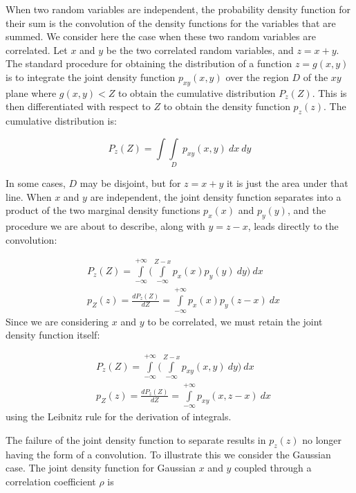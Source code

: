 \documentclass{article}
\begin{document}
When two random variables are independent, the probability density function for their sum is the
convolution of the density functions for the variables that are summed. We consider here the case
when these two random variables are correlated. Let $x$ and $y$ be the two correlated random variables,
and $z = x + y$. The standard procedure for obtaining the distribution of a function $z = g(x,y)$ is to
integrate the joint density function $p_{xy}(x,y)$ over the region $D$ of the $xy$ plane where $g(x,y) < Z$ to
obtain the cumulative distribution $P_z(Z)$. This is then differentiated with respect to $Z$ to obtain the
density function $p_z(z)$. The cumulative distribution is:

\begin{equation}
    P_z(Z)= \int\int\limits_D \> p_{xy}(x,y) \>dx \>dy
\end{equation}

In some cases, $D$ may be disjoint, but for $z = x + y$ it is just the area under that line. When $x$ and $y$ are
independent, the joint density function separates into a product of the two marginal density functions
$p_x(x)$ and $p_y(y)$, and the procedure we are about to describe, along with $y = z - x$, leads directly to the
convolution:

\begin{equation}
    \begin{split}
        & P_z(Z) = \int\limits_{-\infty}^{+\infty} \Biggl( \int\limits_{-\infty}^{Z-x} p_x(x)p_y(y) \> dy \Biggr) \> dx \\
        & p_Z(z) = \frac{dP_z(Z)}{dZ} = \int\limits_{-\infty}^{+\infty} p_x(x)p_y(z-x) \> dx
    \end{split}
\end{equation}
Since we are considering $x$ and $y$ to be correlated, we must retain the joint density function itself:

\begin{equation}
    \begin{split}
        & P_z(Z) = \int\limits_{-\infty}^{+\infty} \Biggl( \int\limits_{-\infty}^{Z-x} p_{xy}(x, y) \> dy \Biggr) \> dx \\
        & p_Z(z) = \frac{dP_z(Z)}{dZ} = \int\limits_{-\infty}^{+\infty} p_{xy}(x, z-x) \> dx
    \end{split}
\end{equation}
using the Leibnitz rule for the derivation of integrals. 

The failure of the joint density function to separate results in $p_z(z)$ no longer having the form of a
convolution. To illustrate this we consider the Gaussian case. The joint density function for Gaussian
$x$ and $y$ coupled through a correlation coefficient $\rho$ is
\end{document}
